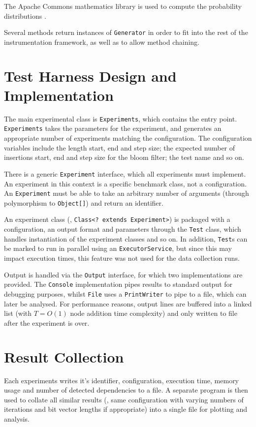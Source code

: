 	The Apache Commons mathematics library is used to compute the probability distributions \citep{ApacheCommonsMath}.
	
	Several methods return instances of \texttt{Generator} in order to fit into the rest of the instrumentation framework, as well as to allow method chaining.

\section{Test Harness Design and Implementation} \label{sec:methodology/implementation}
The main experimental class is \texttt{Experiments}, which contains the entry point. \texttt{Experiments} takes the parameters for the experiment, and generates an appropriate number of experiments matching the configuration. The configuration variables include the length start, end and step size; the expected number of insertions start, end and step size for the bloom filter; the test name and so on.

There is a generic \texttt{Experiment} interface, which all experiments must implement. An experiment in this context is a specific benchmark class, not a configuration. An \texttt{Experiment} must be able to take an arbitrary number of arguments (through polymorphism to \texttt{Object[]}) and return an identifier.

An experiment class (\ie, \texttt{Class<? extends Experiment>}) is packaged with a configuration, an output format and parameters through the \texttt{Test} class, which handles instantiation of the experiment classes and so on. In addition, \texttt{Test}s can be marked to run in parallel using an \texttt{ExecutorService}, but since this may impact execution times, this feature was not used for the data collection runs.

Output is handled via the \texttt{Output} interface, for which two implementations are provided. The \texttt{Console} implementation pipes results to standard output for debugging purposes, whilst \texttt{File} uses a \texttt{PrintWriter} to pipe to a file, which can later be analysed. For performance reasons, output lines are buffered into a linked list (with $T=O(1)$ node addition time complexity) and only written to file after the experiment is over.

\section{Result Collection} \label{sec:methodology/collection}
Each experiments writes it's identifier, configuration, execution time, memory usage and number of detected dependencies to a file. A separate program is then used to collate all similar results (\ie, same configuration with varying numbers of iterations and bit vector lengths if appropriate) into a single file for plotting and analysis.


